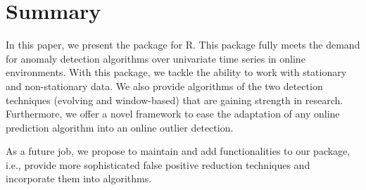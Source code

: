 \documentclass[a4paper]{article}\usepackage[]{graphicx}\usepackage[]{color}
\begin{document}
\section{Summary}\label{sec:summary}

In this paper, we present the  package for R. This package fully meets the demand for anomaly detection algorithms over univariate time series in online environments. With this package, we tackle the ability to work with stationary and non-stationary data. We also provide algorithms of the two detection techniques (evolving and window-based) that are gaining strength in research. Furthermore, we offer a novel framework to ease the adaptation of any online prediction algorithm into an online outlier detection.

As a future job, we propose to maintain and add functionalities to our  package, i.e., provide more sophisticated false positive reduction techniques and incorporate them into algorithms.




\end{document}
